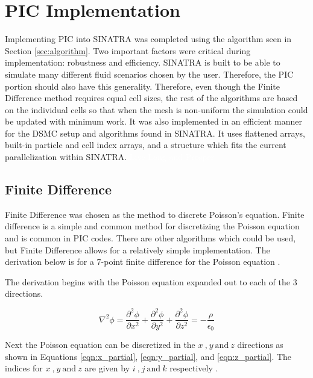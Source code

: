 \section{PIC Implementation}

Implementing PIC into SINATRA was completed using the algorithm seen in Section \ref{sec:algorithm}. Two important factors were critical during implementation: robustness and efficiency. SINATRA is built to be able to simulate many different fluid scenarios chosen by the user. Therefore, the PIC portion should also have this generality. Therefore, even though the Finite Difference method requires equal cell sizes, the rest of the algorithms are based on the individual cells so that when the mesh is non-uniform the simulation could be updated with minimum work. It was also implemented in an efficient manner for the DSMC setup and algorithms found in SINATRA. It uses flattened arrays, built-in particle and cell index arrays, and a structure which fits the current parallelization within SINATRA. \textcolor{white}{Live Long and Prosper}

\subsection{Finite Difference}
\label{sec:finite_diff}

\indent Finite Difference was chosen as the method to discrete Poisson's equation. Finite difference is a simple and common method for discretizing the Poisson equation and is common in PIC codes. There are other algorithms which could be used, but Finite Difference allows for a relatively simple implementation. The derivation below is for a 7-point finite difference for the Poisson equation \cite{FD_GS,FDM}.

The derivation begins with the Poisson equation expanded out to each of the 3 directions. 

\begin{equation}
    \label{eqn:poisson_expanded}
    \nabla^2 \phi = \frac{\partial^2 \phi}{\partial x^2} + \frac{\partial^2 \phi}{\partial y^2} + \frac{\partial^2 \phi}{\partial z^2} = - \frac{\rho}{\epsilon_0}
\end{equation}

Next the Poisson equation can be discretized in the \(x \: \text{,} \: y \: \text{and} \: z\) directions as shown in Equations \ref{eqn:x_partial}, \ref{eqn:y_partial}, and \ref{eqn:z_partial}. The indices for \(x \: \text{,} \: y \: \text{and} \: z\) are given by \(i \: \text{,} \: j \: \text{and} \: k\) respectively \cite{FD_GS}. 

